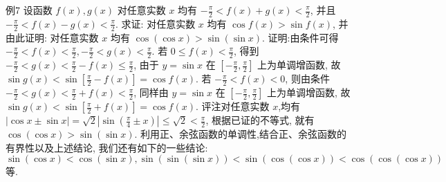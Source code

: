 例7 设函数 $f(x), g(x)$ 对任意实数 $x$ 均有 $-\frac{\pi}{2}<f(x)+g(x)<\frac{\pi}{2}$, 并且 $-\frac{\pi}{2}<f(x)-g(x)<\frac{\pi}{2}$. 求证: 对任意实数 $x$ 均有 $\cos f(x)> \sin f(x)$, 并由此证明: 对任意实数 $x$ 均有 $\cos (\cos x)>\sin (\sin x)$.
证明:由条件可得 $-\frac{\pi}{2}<f(x)<\frac{\pi}{2},-\frac{\pi}{2}<g(x)<\frac{\pi}{2}$.
若 $0 \leqslant f(x)<\frac{\pi}{2}$, 得到 $-\frac{\pi}{2}<g(x)<\frac{\pi}{2}-f(x) \leqslant \frac{\pi}{2}$, 由于 $y=\sin x$ 在 $\left[-\frac{\pi}{2}, \frac{\pi}{2}\right]$ 上为单调增函数, 故 $\sin g(x)<\sin \left[\frac{\pi}{2}-f(x)\right]=\cos f(x)$.
若 $-\frac{\pi}{2}<f(x)<0$, 则由条件 $-\frac{\pi}{2}<g(x)<\frac{\pi}{2}+f(x)<\frac{\pi}{2}$, 同样由 $y=\sin x$ 在 $\left[-\frac{\pi}{2}, \frac{\pi}{2}\right]$ 上为单调增函数, 故 $\sin g(x)<\sin \left[\frac{\pi}{2}+f(x)\right]= \cos f(x)$.
评注对任意实数 $x$,均有 $|\cos x \pm \sin x|=\sqrt{2}\left|\sin \left(\frac{\pi}{4} \pm x\right)\right| \leqslant \sqrt{2}< \frac{\pi}{2}$, 根据已证的不等式, 就有 $\cos (\cos x)>\sin (\sin x)$.
利用正、余弦函数的单调性,结合正、余弦函数的有界性以及上述结论, 我们还有如下的一些结论: $\sin (\cos x)<\cos (\sin x), \sin (\sin (\sin x))< \sin (\cos (\cos x))<\cos (\cos (\cos x))$ 等.



